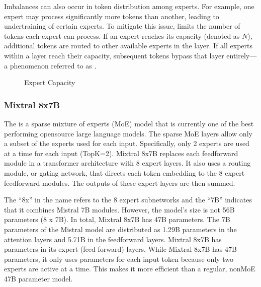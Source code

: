 \documentclass[letterpaper,11pt,english]{sphinxmanual}
\begin{document}
\sphinxAtStartPar
Imbalances can also occur in token distribution among experts. For
example, one expert may process significantly more tokens than another,
leading to undertraining of certain experts. To mitigate this issue,
 limits the number of tokens each expert can process.
If an expert reaches its capacity (denoted as \(N\)), additional
tokens are routed to other available experts in the layer. If all
experts within a layer reach their capacity, subsequent tokens bypass
that layer entirely—a phenomenon referred to as .

\begin{figure}[htbp]
\centering
\capstart

\noindent{}
\caption{Expert Capacity}\label{\detokenize{pretraining:id27}}\end{figure}


\subsubsection{Mixtral 8x7B}
\label{\detokenize{pretraining:mixtral-8x7b}}
\sphinxAtStartPar
The  is a
sparse mixture of experts (MoE) model that is currently one of the best
performing open\sphinxhyphen{}source large language models. The sparse MoE layers
allow only a subset of the experts used for each input. Specifically,
only 2 experts are used at a time for each input (TopK=2). Mixtral 8x7B
replaces each feed\sphinxhyphen{}forward module in a transformer architecture with 8
expert layers. It also uses a routing module, or gating network, that
directs each token embedding to the 8 expert feed\sphinxhyphen{}forward modules. The
outputs of these expert layers are then summed.

\sphinxAtStartPar
The “8x” in the name refers to the 8 expert sub\sphinxhyphen{}networks and the “7B”
indicates that it combines Mistral 7B modules. However, the model’s size
is not 56B parameters (8 x 7B). In total, Mixtral 8x7B has 47B
parameters. The 7B parameters of the Mistral model are distributed as
1.29B parameters in the attention layers and 5.71B in the feed\sphinxhyphen{}forward
layers. Mixtral 8x7B has  parameters in its expert (feed
forward) layers. While Mixtral 8x7B has 47B parameters, it only uses
 parameters for each input token because only two experts are
active at a time. This makes it more efficient than a regular, non\sphinxhyphen{}MoE
47B parameter model.
\end{document}
